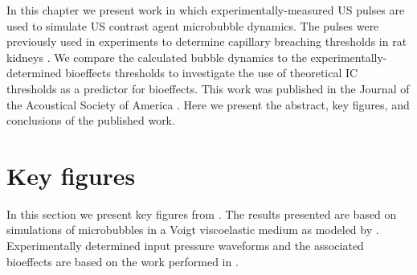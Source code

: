 In this chapter we present work in which experimentally-measured
\ac{US} pulses are used to simulate \ac{US} contrast agent microbubble
dynamics. The pulses were previously used in experiments to determine
capillary breaching thresholds in rat kidneys \citep{Miller2008b}. We
compare the calculated bubble dynamics to the
experimentally-determined bioeffects thresholds to investigate the use
of theoretical \ac{IC} thresholds as a predictor for bioeffects. This
work was published in the Journal of the Acoustical Society of America
\citep{Patterson2012b, Patterson2012a}. Here we present the abstract, key figures, and
conclusions of the published work.
%


\section{Key figures}
\label{sec:usbe_bubble_key_figures}
In this section we present key figures from \cite{Patterson2012a}. The
results presented are based on simulations of microbubbles in a Voigt
viscoelastic medium as modeled by \cite{Yang2005}. Experimentally
determined input pressure waveforms and the associated bioeffects are
based on the work performed in \cite{Miller2008b}.

